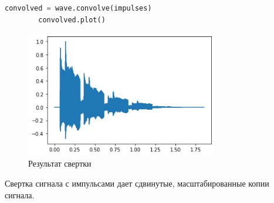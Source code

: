 \documentclass[a4paper, 12pt]{report}
\begin{document}
	\begin{lstlisting}[language=Python,caption=Применим свертку сигнала с импульсами]
		convolved = wave.convolve(impulses)
		convolved.plot()	
	\end{lstlisting}
	\begin{figure}[H]
		\centering
		\includegraphics[width=0.75\textwidth]{imp3.png}
		\caption{Результат свертки}
		\label{fig:imp3}
	\end{figure}
	Свертка сигнала с импульсами дает сдвинутые, масштабированные копии сигнала.
\end{document}
